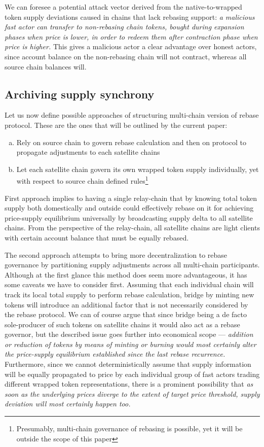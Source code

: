\documentclass{article}
\begin{document}
We can foresee a potential attack vector derived from the native-to-wrapped token supply deviations caused in chains that lack rebasing support: \textit{a malicious fast actor can transfer to non-rebasing chain tokens, bought during expansion phases when price is lower, in order to redeem them after contraction phase when price is higher.} This gives a malicious actor a clear advantage over honest actors, since account balance on the non-rebasing chain will not contract, whereas all source chain balances will.

\subsection{Archiving supply synchrony}

Let us now define possible approaches of structuring multi-chain version of rebase protocol. These are the ones that will be outlined by the current paper:

\begin{enumerate}[a.]
	\item Rely on source chain to govern rebase calculation and then on protocol to propagate adjustments to each satellite chains
	\item Let each satellite chain govern its own wrapped token supply individually, yet with respect to source chain defined rules\footnote{Presumably, multi-chain governance of rebasing is possible, yet it will be outside the scope of this paper}
\end{enumerate}

First approach implies to having a single relay-chain that by knowing total token supply both domestically and outside could effectively rebase on it for achieving price-supply equilibrium universally by broadcasting supply delta to all satellite chains. From the perspective of the relay-chain, all satellite chains are light clients with certain account balance that must be equally rebased.

The second approach attempts to bring more decentralization to rebase governance by partitioning supply adjustments across all multi-chain participants. Although at the first glance this method does seem more advantageous, it has some caveats we have to consider first. Assuming that each individual chain will track its local total supply to perform rebase calculation, bridge by minting new tokens will introduce an additional factor that is not necessarily considered by the rebase protocol. We can of course argue that since bridge being a de facto sole-producer of such tokens on satellite chains it would also act as a rebase governor, but the described issue goes further into economical scope --- \textit{addition or reduction of tokens by means of minting or burning would most certainly alter the price-supply equilibrium established since the last rebase recurrence.} Furthermore, since we cannot deterministically assume that supply information will be equally propagated to price by each individual group of fast actors trading different wrapped token representations, there is a prominent possibility that \textit{as soon as the underlying prices diverge to the extent of target price threshold, supply deviation will most certainly happen too.}
\end{document}
